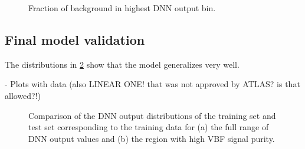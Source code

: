 \begin{figure}[t]
    \caption{Fraction of background in highest DNN output bin. }
    \label{fig:bkg-fractions}
\end{figure}


\subsection{Final model validation}

The distributions in \cref{fig:dnn-train-vs-test} show that the model generalizes very well.

- Plots with data (also LINEAR ONE! that was not approved by ATLAS? is that allowed?!)


\begin{figure}[t]
    \caption{Comparison of the DNN output distributions of the training set and test set corresponding to the training data for (a) the full range of DNN output values and (b) the region with high VBF signal purity.}
    \label{fig:dnn-train-vs-test}
\end{figure}
